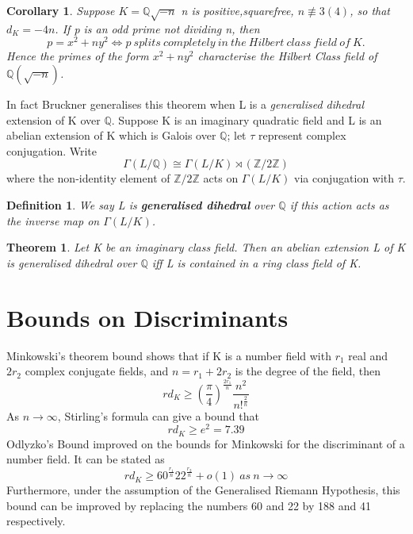 \documentclass[preprint,12pt,reqno]{elsarticle}
\newtheorem{theorem}{Theorem}
\newtheorem{corollary}{Corollary}[theorem]
\newtheorem{definition}{Definition}
\begin{document}
\begin{corollary}
Suppose $K=\mathbb{Q}{\sqrt{-n}}$ n is positive,squarefree, $n\not\equiv 3(4)$, so that $d_K=-4n$. If p is an odd prime not dividing n, then
\begin{equation} p=x^2+ny^2 \Longleftrightarrow p\:splits\:completely\:in\:the\:Hilbert\:class\:field\:of\:K.
\end{equation}
Hence the primes of the form $x^2+ny^2$ characterise the Hilbert Class field of $\mathbb{Q}(\sqrt{-n})$.
\end{corollary}
In fact Bruckner \cite{BRUC} generalises this theorem when L is a \textit{generalised dihedral} extension of K over $\mathbb{Q}$. Suppose K is an imaginary quadratic field and L is an abelian extension of K which is Galois over $\mathbb{Q}$; let $\tau$ represent complex conjugation. Write
\begin{equation}
   \Gamma(L/\mathbb{Q})\cong \Gamma(L/K)\rtimes(\mathbb{Z}/2\mathbb{Z})
\end{equation}
where the non-identity element of $\mathbb{Z}/2\mathbb{Z}$ acts on $\Gamma(L/K)$ via conjugation with $\tau$.
\begin{definition}
 We say L is \textbf{generalised dihedral} over $\mathbb{Q}$ if this action acts as the inverse map on $\Gamma(L/K)$.
\end{definition}

\begin{theorem}
Let K be an imaginary class field. Then an abelian extension L of K is generalised dihedral over $\mathbb{Q}$ iff L is contained in a ring class field of K.
\end{theorem}


\section{Bounds on Discriminants}
Minkowski's theorem bound shows that if K is a number field with $r_1$ real and $2r_2$ complex conjugate fields, and $n=r_1+2r_2$ is the degree of the field, then 
\begin{equation}
rd_K\geqslant (\frac{\pi}{4})^{\frac{2r_1}{n}}\frac{n^2}{n!^{\frac{2}{n}}}
\end{equation} 
As $n\rightarrow \infty$, Stirling's formula can give a bound that
\begin{equation}
    rd_K\geqslant e^2 = 7.39
\end{equation}
Odlyzko's Bound \cite{ODL2} improved on the bounds for Minkowski for the discriminant of a number field. It can be stated as  
\begin{equation}
rd_K\geqslant 60^{\frac{r_1}{n}}22^{\frac{r_2}{n}}+o(1)\:as\:n\rightarrow \infty   
\end{equation}
Furthermore, under the assumption of the Generalised Riemann Hypothesis, 
this bound can be improved by replacing the numbers 60 and 22 by 188 and 41 respectively. 
\end{document}
